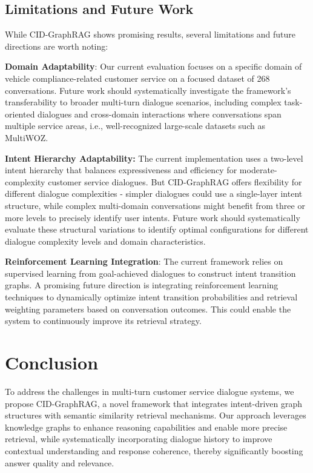 \documentclass[
]{style/ceurart}
\begin{document}
\subsection {Limitations and Future Work} 

While CID-GraphRAG shows promising results, several limitations and future directions are worth noting:

\textbf{Domain Adaptability}: Our current evaluation focuses on a specific domain of vehicle compliance-related customer service on a focused dataset of 268 conversations. Future work should systematically investigate the framework's transferability to broader multi-turn dialogue scenarios, including complex task-oriented dialogues and cross-domain interactions where conversations span multiple service areas, i.e., well-recognized large-scale datasets such as MultiWOZ.

\textbf{Intent Hierarchy Adaptability:} The current implementation uses a two-level intent hierarchy that balances expressiveness and efficiency for moderate-complexity customer service dialogues. But CID-GraphRAG offers flexibility for different dialogue complexities - simpler dialogues could use a single-layer intent structure, while complex multi-domain conversations might benefit from three or more levels to precisely identify user intents. Future work should systematically evaluate these structural variations to identify optimal configurations for different dialogue complexity levels and domain characteristics.

\textbf{Reinforcement Learning Integration}: The current framework relies on supervised learning from goal-achieved dialogues to construct intent transition graphs. A promising future direction is integrating reinforcement learning techniques to dynamically optimize intent transition probabilities and retrieval weighting parameters based on conversation outcomes. This could enable the system to continuously improve its retrieval strategy.

\section{Conclusion}
To address the challenges in multi-turn customer service dialogue systems, we propose CID-GraphRAG, a novel framework that integrates intent-driven graph structures with semantic similarity retrieval mechanisms. Our approach leverages knowledge graphs to enhance reasoning capabilities and enable more precise retrieval, while systematically incorporating dialogue history to improve contextual understanding and response coherence, thereby significantly boosting answer quality and relevance.
\end{document}
